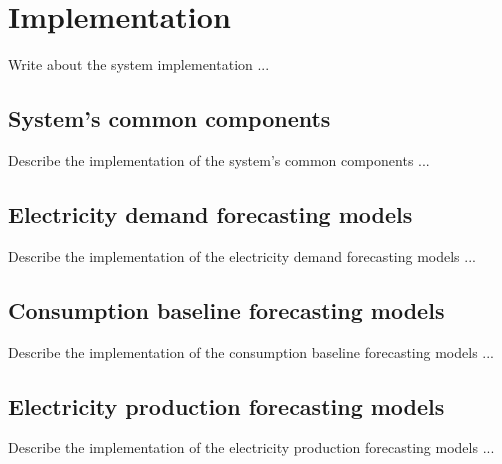 \chapter{Implementation}
\label{cha:implementation}
\vspace{0.4 cm}

Write about the system implementation ...


\section{System's common components}
\label{sec:componentsimpl}
\vspace{0.2 cm}

Describe the implementation of the system's common components ...


\section{Electricity demand forecasting models}
\label{sec:demandimpl}
\vspace{0.2 cm}

Describe the implementation of the electricity demand forecasting models ...


\section{Consumption baseline forecasting models}
\label{sec:baselineimpl}
\vspace{0.2 cm}

Describe the implementation of the consumption baseline forecasting models ...


\section{Electricity production forecasting models}
\label{sec:productionimpl}
\vspace{0.2 cm}

Describe the implementation of the electricity production forecasting models ...
